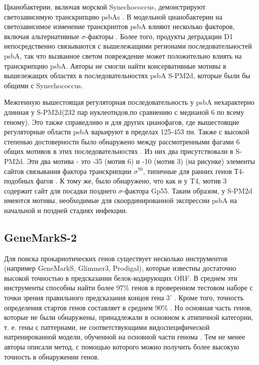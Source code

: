 \documentclass[14pt]{extarticle}
\begin{document}
    \par{Цианобактерии, включая морской Synechococcus, демонстрируют светозависимую транскрипцию psbAs \cite{18_,23_}. В
    модельной цианобактерии на светозависимое изменение транскриптов psbA влияют несколько факторов, включая 
    альтернативные $\sigma$-факторы \cite{24_,25_}. Более того, продукты деградации D1 непосредственно связываются с 
    вышележащими регионами последовательностей psbA, так что вызванное светом повреждение может положительно влиять на 
    транскрипцию psbA. Авторы не смогли найти консервативные мотивы в вышележащих областях в последовательностях psbA 
    S-PM2d, которые были бы общими с Synechococcus.} 
    
    \par{Межгенную вышестоящая регуляторная последовательность у psbA нехарактерно длинная у S-PM2d(232 пар 
    нуклеотидов,по сравнению с медианой 6 по всему геному). Это также справедливо и для других цианофагов, где 
    вышестоящие регуляторные области psbA варьируют в пределах 125-453 пн. Также с высокой степенью достоверности  было 
    обнаружено между рассмотренными фагами 6 общих мотивов в этих последовательностях \cite{puxty-evanx}. Из них два 
    присутствовали в S-PM2d. Эти два мотива - это  -35 (мотив 6) и -10 (мотив 3) (на рисунке) элементы сайтов связывания
    фактора транскрипции $\sigma^{70}$, типичные для ранних генов Т4-подобных фагов \cite{31_}. К тому же, было 
    обнаружено, что как и у T4, мотив 3 содержит сайт для посадки позднего $\sigma$-фактора Gp55. Таким образом, у 
    S-PM2d имеются мотивы, необходимые для скоординированной экспрессии psbA на начальной и поздней стадиях инфекции.}
    
    \begin{center}
        \item \subsection{GeneMarkS-2}
    \end{center}
    
    \par{Для поиска прокариотических генов существует несколько инструментов (например GeneMarkS, Glimmer3, Prodigal), 
    которые известны достаточно высокой точностью в предсказании белок-кодирующих ORF. В среднем эти инструменты 
    способны найти более 97\% генов в проверенном тестовом наборе с точки зрения правильного предсказания концов гена 3'
    \cite{besemer,delcher,hyatt}. Кроме того, точность определения стартов генов 
    составляет в среднем 90\% \cite{hyatt}. Но основная часть генов, которые не были обнаружены, принадлежали в 
    основном к атипичной категории, т. е. гены с паттернами, не соответствующими видоспецифической натренированной 
    модели, обученной на основной части генома \cite{bordov1}. Тем не менее авторы описали метод, с помощью 
    которого можно получить более высокую точность в обнаружении генов. \cite{lomsad}}
    
\end{document}
